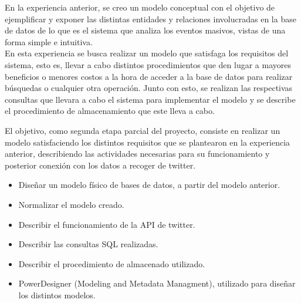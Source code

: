 \documentclass{memoria}
\begin{document}


\indices
{}
En la experiencia anterior, se creo un modelo conceptual con el objetivo de ejemplificar y exponer las distintas entidades y relaciones involucradas en la base de datos de lo que es el sistema que analiza los eventos masivos, vistas de una forma simple e intuitiva.\\
En esta experiencia se busca realizar un modelo que satisfaga los requisitos del sistema, esto es, llevar a cabo distintos procedimientos que den lugar a mayores beneficios o menores costos a la hora de acceder a la base de datos para realizar búsquedas o cualquier otra operación. Junto con esto, se realizan las respectivas consultas que llevara a cabo el sistema para implementar el modelo y se describe el procedimiento de almacenamiento que este lleva a cabo.



El objetivo, como segunda etapa parcial del proyecto, consiste en realizar un modelo satisfaciendo los distintos requisitos que se plantearon en la experiencia anterior, describiendo las actividades necesarias para su funcionamiento y posterior conexión con los datos a recoger de twitter.

\begin{itemize}
\item Diseñar un modelo físico de bases de datos, a partir del modelo anterior.
\item Normalizar el modelo creado.
\item Describir el funcionamiento de la API de twitter.
\item Describir las consultas SQL realizadas.
\item Describir el procedimiento de almacenado utilizado.
\end{itemize}


\begin{itemize}
\item PowerDesigner (Modeling and Metadata Managment), utilizado para diseñar los distintos modelos.
\end{itemize}
\end{document}
